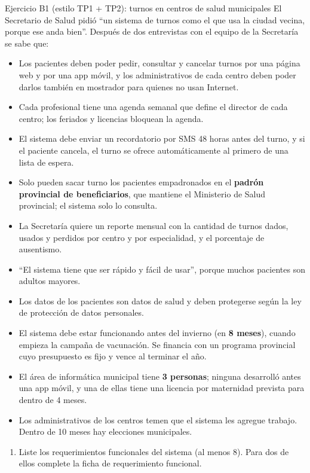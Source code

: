 \documentclass[11pt,a4paper]{article}
\begin{document}
\begin{enunciado}{Ejercicio B1 (estilo TP1 + TP2): turnos en centros de salud municipales}
El Secretario de Salud pidió ``un sistema de turnos como el que usa la ciudad vecina, porque ese anda bien''.
Después de dos entrevistas con el equipo de la Secretaría se sabe que:
\begin{itemize}
  \item Los pacientes deben poder pedir, consultar y cancelar turnos por una página web y por una app móvil,
  y los administrativos de cada centro deben poder darlos también en mostrador para quienes no usan Internet.
  \item Cada profesional tiene una agenda semanal que define el director de cada centro; los feriados y
  licencias bloquean la agenda.
  \item El sistema debe enviar un recordatorio por SMS 48 horas antes del turno, y si el paciente cancela, el
  turno se ofrece automáticamente al primero de una lista de espera.
  \item Solo pueden sacar turno los pacientes empadronados en el \textbf{padrón provincial de beneficiarios},
  que mantiene el Ministerio de Salud provincial; el sistema solo lo consulta.
  \item La Secretaría quiere un reporte mensual con la cantidad de turnos dados, usados y perdidos por centro y
  por especialidad, y el porcentaje de ausentismo.
  \item ``El sistema tiene que ser rápido y fácil de usar'', porque muchos pacientes son adultos mayores.
  \item Los datos de los pacientes son datos de salud y deben protegerse según la ley de protección de datos
  personales.
  \item El sistema debe estar funcionando antes del invierno (en \textbf{8 meses}), cuando empieza la campaña de
  vacunación. Se financia con un programa provincial cuyo presupuesto es fijo y vence al terminar el año.
  \item El área de informática municipal tiene \textbf{3 personas}; ninguna desarrolló antes una app móvil, y una
  de ellas tiene una licencia por maternidad prevista para dentro de 4 meses.
  \item Los administrativos de los centros temen que el sistema les agregue trabajo. Dentro de 10 meses hay
  elecciones municipales.
\end{itemize}
\normalsize
\begin{enumerate}[label=\alph*)]
  \item Liste los requerimientos funcionales del sistema (al menos 8). Para dos de ellos complete la ficha de
  requerimiento funcional.

\end{enumerate}
\end{enunciado}
\end{document}
